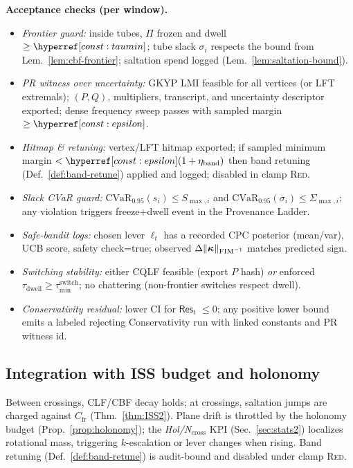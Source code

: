 \begin{mdframed}
\textbf{Acceptance checks (per window).}
\begin{itemize}[leftmargin=*]
\item \emph{Frontier guard:} inside tubes, $\Pi$ frozen and dwell $\ge\constref{taumin}$; tube slack $\sigma_i$ respects the bound from Lem.~\ref{lem:cbf-frontier}; saltation spend logged (Lem.~\ref{lem:saltation-bound}).
\item \emph{PR witness over uncertainty:} GKYP LMI feasible for all vertices (or LFT extremals); $(P,Q)$, multipliers, transcript, and uncertainty descriptor exported; dense frequency sweep passes with sampled margin $\ge \constref{epsilon}$.
\item \emph{Hitmap \& retuning:} vertex/LFT hitmap exported; if sampled minimum margin $<\constref{epsilon}(1+\eta_{\mathrm{band}})$ then band retuning (Def.~\ref{def:band-retune}) applied and logged; disabled in clamp \textsc{Red}.
\item \emph{Slack CVaR guard:} $\mathrm{CVaR}_{0.95}(s_i)\le S_{\max,i}$ and $\mathrm{CVaR}_{0.95}(\sigma_i)\le \Sigma_{\max,i}$; any violation triggers freeze+dwell event in the Provenance Ladder.
\item \emph{Safe-bandit logs:} chosen lever $\ell_t$ has a recorded CPC posterior (mean/var), UCB score, safety check=\textsf{true}; observed $\Delta\|\bm\kappa\|_{\mathrm{FIM}^{-1}}$ matches predicted sign.
\item \emph{Switching stability:} either CQLF feasible (export $P$ hash) \emph{or} enforced $\tau_{\mathrm{dwell}}\!\ge\!\tau_{\min}^{\mathrm{switch}}$; no chattering (non-frontier switches respect dwell).
\item \emph{Conservativity residual:} lower CI for $\mathsf{Res}_t$ $\le 0$; any positive lower bound emits a labeled rejecting \textsf{Conservativity} run with linked constants and PR witness id.
\end{itemize}
\end{mdframed}

\subsection*{Integration with ISS budget and holonomy}
Between crossings, CLF/CBF decay holds; at crossings, saltation jumps are charged against $C_{\mathrm{fr}}$ (Thm.~\ref{thm:ISS2}). Plane drift is throttled by the holonomy budget (Prop.~\ref{prop:holonomy}); the \emph{Hol/N$_{\mathrm{cross}}$} KPI (Sec.~\ref{sec:stats2}) localizes rotational mass, triggering $k$-escalation or lever changes when rising. Band retuning (Def.~\ref{def:band-retune}) is audit-bound and disabled under clamp \textsc{Red}.
